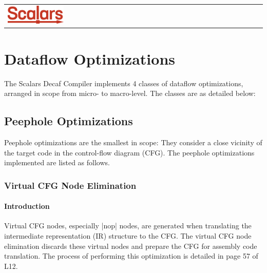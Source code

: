 



    \noindent
    \begin{tabularx}{\textwidth}{X r}
        \hspace{-0.1in}
        \begin{adjustbox}{valign=t}
            \includegraphics[width=0.23\textwidth]{img/scalars_logo.png}
        \end{adjustbox}
        \multirow{3}{0.75\textwidth}{
            \raggedleft\large\textbf{\doctitle} \\
            \normalsize\docauthors \\
            \docinitiated
        }
    \end{tabularx}
    \hspace{0.2in}
    \makeatother

\tableofcontents

\section{Dataflow Optimizations}

The Scalars Decaf Compiler implements 4 classes of dataflow optimizations, arranged in scope from micro- to macro-level. The classes are as detailed below:

\subsection{Peephole Optimizations}

Peephole optimizations are the smallest in scope: They consider a close vicinity of the target code in the control-flow diagram (CFG). The peephole optimizations implemented are listed as follows.

\subsubsection{Virtual CFG Node Elimination}

\paragraph{Introduction}

Virtual CFG nodes, especially |nop| nodes, are generated when translating the intermediate representation (IR) structure to the CFG. The virtual CFG node elimination discards these virtual nodes and prepare the CFG for assembly code translation. The process of performing this optimization is detailed in page 57 of L12.

